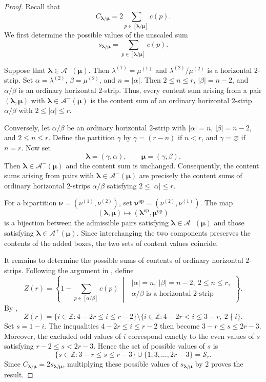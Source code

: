 \documentclass[10pt,a4paper]{amsart}
\newcommand{\Z}{\mathbb{Z}}
\newcommand{\1}{\mathfrak{1}}
\begin{document}
\begin{proof}
Recall that
$$
C_{\bm\lambda/\bm\mu}
=2\sum_{p\in[\bm\lambda/\bm\mu]}c(p).
$$
We first determine the possible values of the unscaled sum
$$
s_{\bm\lambda/\bm\mu}
=\sum_{p\in[\bm\lambda/\bm\mu]}c(p).
$$

Suppose that $\bm\lambda\in\mathcal A^-(\bm\mu)$.
Then $\lambda^{(1)}=\mu^{(1)}$ and
$\lambda^{(2)}/\mu^{(2)}$ is a horizontal $2$-strip.
Set $\alpha=\lambda^{(2)}$, $\beta=\mu^{(2)}$,
and $n=|\alpha|$.
Then $2\leq n\leq r$, $|\beta|=n-2$, and
$\alpha/\beta$ is an ordinary horizontal $2$-strip.
Thus, every content sum arising from a pair
$(\bm\lambda,\bm\mu)$ with
$\bm\lambda\in\mathcal A^-(\bm\mu)$ is the content sum
of an ordinary horizontal $2$-strip $\alpha/\beta$
with $2\leq|\alpha|\leq r$.

Conversely, let $\alpha/\beta$ be an ordinary
horizontal $2$-strip with $|\alpha|=n$,
$|\beta|=n-2$, and $2\leq n\leq r$.
Define the partition $\gamma$ by $\gamma=(r-n)$
if $n<r$, and $\gamma=\varnothing$ if $n=r$.
Now set
$$
\bm\lambda=(\gamma,\alpha),
\qquad
\bm\mu=(\gamma,\beta).
$$
Then $\bm\lambda\in\mathcal A^-(\bm\mu)$ and the
content sum is unchanged.
Consequently, the content sums arising from pairs
with $\bm\lambda\in\mathcal A^-(\bm\mu)$ are precisely
the content sums of ordinary horizontal $2$-strips
$\alpha/\beta$ satisfying $2\leq|\alpha|\leq r$.

For a bipartition
$\bm\nu=(\nu^{(1)},\nu^{(2)})$, set
$\bm\nu^{\mathrm{op}}=(\nu^{(2)},\nu^{(1)})$.
The map
$$
(\bm\lambda,\bm\mu)
\longmapsto
(\bm\lambda^{\mathrm{op}},\bm\mu^{\mathrm{op}})
$$
is a bijection between the admissible pairs satisfying
$\bm\lambda\in\mathcal A^-(\bm\mu)$ and those satisfying
$\bm\lambda\in\mathcal A^+(\bm\mu)$.
Since interchanging the two components preserves
the contents of the added boxes, the two sets of
content values coincide.

It remains to determine the possible sums of contents
of ordinary horizontal $2$-strips.
Following the argument in
\cite[proof of Proposition~4.9(1)]{RX07}, define
$$
Z(r)=
\left\{
1-\sum_{p\in[\alpha/\beta]}c(p)
\;\middle|\;
\begin{array}{c}
|\alpha|=n,\ |\beta|=n-2,\ 2\leq n\leq r,\\
\alpha/\beta\text{ is a horizontal $2$-strip}
\end{array}
\right\}.
$$
By \cite[Proposition~2.4]{RS06},
$$
Z(r)=
\{i\in\Z:4-2r\leq i\leq r-2\}
\setminus
\{i\in\Z:4-2r<i\leq3-r,\ 2\nmid i\}.
$$
Set $s=1-i$.
The inequalities $4-2r\leq i\leq r-2$ then become
$3-r\leq s\leq2r-3$.
Moreover, the excluded odd values of $i$ correspond
exactly to the even values of $s$ satisfying
$r-2\leq s<2r-3$.
Hence the set of possible values of $s$ is
$$
\{s\in\Z:3-r\leq s\leq r-3\}
\cup\{1,3,\ldots,2r-3\}
=\mathscr S_r.
$$
Since $C_{\bm\lambda/\bm\mu}
=2s_{\bm\lambda/\bm\mu}$, multiplying these possible
values of $s_{\bm\lambda/\bm\mu}$ by $2$
proves the result.
\end{proof}
\end{document}
